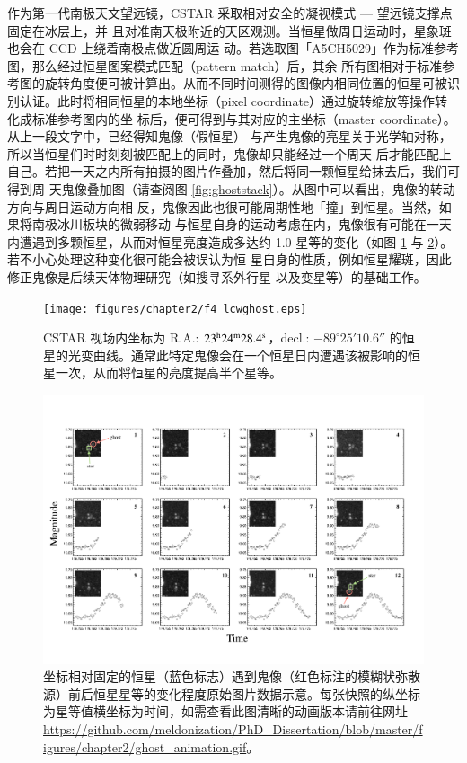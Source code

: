作为第一代南极天文望远镜，CSTAR 采取相对安全的凝视模式 --- 望远镜支撑点固定在冰层上，并
且对准南天极附近的天区观测。当恒星做周日运动时，星象斑也会在 CCD 上绕着南极点做近圆周运
动。若选取图「A5CH5029」作为标准参考图，那么经过恒星图案模式匹配（pattern match）后，其余
所有图相对于标准参考图的旋转角度便可被计算出。从而不同时间测得的图像内相同位置的恒星可被识
别认证。此时将相同恒星的本地坐标（pixel coordinate）通过旋转缩放等操作转化成标准参考图内的坐
标后，便可得到与其对应的主坐标（master coordinate）。从上一段文字中，已经得知鬼像（假恒星）
与产生鬼像的亮星关于光学轴对称，所以当恒星们时时刻刻被匹配上的同时，鬼像却只能经过一个周天
后才能匹配上自己。若把一天之内所有拍摄的图片作叠加，然后将同一颗恒星给抹去后，我们可得到周
天鬼像叠加图（请查阅图 \ref{fig:ghoststack}）。从图中可以看出，鬼像的转动方向与周日运动方向相
反，鬼像因此也很可能周期性地「撞」到恒星。当然，如果将南极冰川板块的微弱移动\cite{ZhouX2013}
与恒星自身的运动考虑在内，鬼像很有可能在一天内遭遇到多颗恒星，从而对恒星亮度造成多达约 1.0 
星等的变化（如图 \ref{fig:lcwghost} 与 \ref{fig:ghostseq}）。若不小心处理这种变化很可能会被误认为恒
星自身的性质，例如恒星耀斑\cite{Liang2016}，因此修正鬼像是后续天体物理研究（如搜寻系外行星
\cite{Wang2014CSTAR} 以及变星\cite{Yang2015}等）的基础工作。

\begin{figure}[t]
\centering
\texttt{[image: figures/chapter2/f4\_lcwghost.eps]}
\caption{CSTAR 视场内坐标为 R.A.: $23^\mathrm{h}24^\mathrm{m}28.4^\mathrm{s}$，decl.: $-89^{\circ}25'10.6''$ 的恒星的光变曲线。通常此特定鬼像会在一个恒星日内遭遇该被影响的恒星一次，从而将恒星的亮度提高半个星等。}
\label{fig:lcwghost}
\end{figure}

\begin{figure}
\centering
\includegraphics[scale=0.8]{figures/chapter2/f5_ghostseq.pdf}
\caption[坐标相对固定的恒星（蓝色标志）遇到鬼像（红色标注的模糊状弥散源）前后恒星星等的变化程度原始图片数据示意。]{坐标相对固定的恒星（蓝色标志）遇到鬼像（红色标注的模糊状弥散源）前后恒星星等的变化程度原始图片数据示意。每张快照的纵坐标为星等值横坐标为时间，如需查看此图清晰的动画版本请前往网址 \url{https://github.com/meldonization/PhD_Dissertation/blob/master/figures/chapter2/ghost_animation.gif}。}
\label{fig:ghostseq}
\end{figure}


